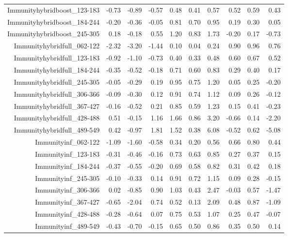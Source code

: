 \begin{table}[ht]
\begin{tabular}{rrrrrrrrrr}
  Immunityhybridboost\_123-183 & -0.73 & -0.89 & -0.57 & 0.48 & 0.41 & 0.57 & 0.52 & 0.59 & 0.43 \\ 
  Immunityhybridboost\_184-244 & -0.20 & -0.36 & -0.05 & 0.81 & 0.70 & 0.95 & 0.19 & 0.30 & 0.05 \\ 
  Immunityhybridboost\_245-305 & 0.18 & -0.18 & 0.55 & 1.20 & 0.83 & 1.73 & -0.20 & 0.17 & -0.73 \\ 
  Immunityhybridfull\_062-122 & -2.32 & -3.20 & -1.44 & 0.10 & 0.04 & 0.24 & 0.90 & 0.96 & 0.76 \\ 
  Immunityhybridfull\_123-183 & -0.92 & -1.10 & -0.73 & 0.40 & 0.33 & 0.48 & 0.60 & 0.67 & 0.52 \\ 
  Immunityhybridfull\_184-244 & -0.35 & -0.52 & -0.18 & 0.71 & 0.60 & 0.83 & 0.29 & 0.40 & 0.17 \\ 
  Immunityhybridfull\_245-305 & -0.05 & -0.29 & 0.19 & 0.95 & 0.75 & 1.20 & 0.05 & 0.25 & -0.20 \\ 
  Immunityhybridfull\_306-366 & -0.09 & -0.30 & 0.12 & 0.91 & 0.74 & 1.12 & 0.09 & 0.26 & -0.12 \\ 
  Immunityhybridfull\_367-427 & -0.16 & -0.52 & 0.21 & 0.85 & 0.59 & 1.23 & 0.15 & 0.41 & -0.23 \\ 
  Immunityhybridfull\_428-488 & 0.51 & -0.15 & 1.16 & 1.66 & 0.86 & 3.20 & -0.66 & 0.14 & -2.20 \\ 
  Immunityhybridfull\_489-549 & 0.42 & -0.97 & 1.81 & 1.52 & 0.38 & 6.08 & -0.52 & 0.62 & -5.08 \\ 
  Immunityinf\_062-122 & -1.09 & -1.60 & -0.58 & 0.34 & 0.20 & 0.56 & 0.66 & 0.80 & 0.44 \\ 
  Immunityinf\_123-183 & -0.31 & -0.46 & -0.16 & 0.73 & 0.63 & 0.85 & 0.27 & 0.37 & 0.15 \\ 
  Immunityinf\_184-244 & -0.37 & -0.55 & -0.20 & 0.69 & 0.58 & 0.82 & 0.31 & 0.42 & 0.18 \\ 
  Immunityinf\_245-305 & -0.10 & -0.33 & 0.14 & 0.91 & 0.72 & 1.15 & 0.09 & 0.28 & -0.15 \\ 
  Immunityinf\_306-366 & 0.02 & -0.85 & 0.90 & 1.03 & 0.43 & 2.47 & -0.03 & 0.57 & -1.47 \\ 
  Immunityinf\_367-427 & -0.65 & -2.04 & 0.74 & 0.52 & 0.13 & 2.09 & 0.48 & 0.87 & -1.09 \\ 
  Immunityinf\_428-488 & -0.28 & -0.64 & 0.07 & 0.75 & 0.53 & 1.07 & 0.25 & 0.47 & -0.07 \\ 
  Immunityinf\_489-549 & -0.43 & -0.70 & -0.15 & 0.65 & 0.50 & 0.86 & 0.35 & 0.50 & 0.14 \\ 

\end{tabular}
\end{table}
